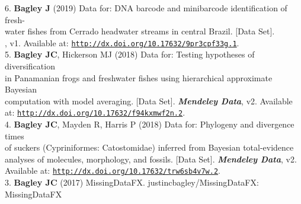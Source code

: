 \documentclass[margin,line]{res}
\begin{document}
\begin{resume}
6. \textbf{Bagley J} (2019) Data for: DNA barcode and minibarcode identification of fresh-\\
\hspace*{8mm} water fishes from Cerrado headwater streams in central Brazil. [Data Set].\\ \vspace{2mm}
, v1. Available at: \href{http://dx.doi.org/10.17632/9pr3cpf33g.1}{\tt http://dx.doi.org/10.17632/9pr3cpf33g.1}. \\
5. \textbf{Bagley JC}, Hickerson MJ (2018) Data for: Testing hypotheses of diversification\\
\hspace*{8mm} in Panamanian frogs and freshwater fishes using hierarchical approximate Bayesian\\
\hspace*{8mm} computation with model averaging. [Data Set]. {\it \textbf{Mendeley Data}}, v2. Available\\ \vspace{2mm}
\hspace*{8mm}at: \href{http://dx.doi.org/10.17632/f94kxmwf2n.2}{\tt http://dx.doi.org/10.17632/f94kxmwf2n.2}. \\
4. \textbf{Bagley JC}, Mayden R, Harris P (2018) Data for: Phylogeny and divergence times\\
\hspace*{8mm} of suckers (Cypriniformes: Catostomidae) inferred from Bayesian total-evidence\\
\hspace*{8mm} analyses of molecules, morphology, and fossils. [Data Set]. {\it \textbf{Mendeley Data}}, v2.\\ \vspace{2mm}
\hspace*{8mm}Available at: \href{http://dx.doi.org/10.17632/trw6sb4v7w.2}{\tt http://dx.doi.org/10.17632/trw6sb4v7w.2}. \\
3. \textbf{Bagley JC} (2017) MissingDataFX. justincbagley/MissingDataFX: MissingDataFX\\

\end{resume}
\end{document}
